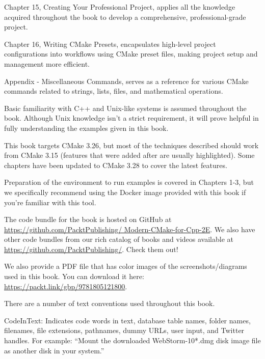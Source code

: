 Chapter 15, Creating Your Professional Project, applies all the knowledge acquired throughout the book to develop a comprehensive, professional-grade project.

Chapter 16, Writing CMake Presets, encapsulates high-level project configurations into workflows using CMake preset files, making project setup and management more efficient.

Appendix - Miscellaneous Commands, serves as a reference for various CMake commands related to strings, lists, files, and mathematical operations.


Basic familiarity with C++ and Unix-like systems is assumed throughout the book. Although Unix knowledge isn’t a strict requirement, it will prove helpful in fully understanding the examples given in this book.

This book targets CMake 3.26, but most of the techniques described should work from CMake 3.15 (features that were added after are usually highlighted). Some chapters have been updated to CMake 3.28 to cover the latest features.

Preparation of the environment to run examples is covered in Chapters 1-3, but we specifically recommend using the Docker image provided with this book if you’re familiar with this tool.


The code bundle for the book is hosted on GitHub at \url{https://github.com/PacktPublishing/ Modern-CMake-for-Cpp-2E}. We also have other code bundles from our rich catalog of books and videos available at \url{https://github.com/PacktPublishing/}. Check them out!



We also provide a PDF file that has color images of the screenshots/diagrams used in this book.
You can download it here: \url{https://packt.link/gbp/9781805121800}.


There are a number of text conventions used throughout this book.

CodeInText: Indicates code words in text, database table names, folder names, filenames, file extensions, pathnames, dummy URLs, user input, and Twitter handles. For example: “Mount the downloaded WebStorm-10*.dmg disk image file as another disk in your system.”

